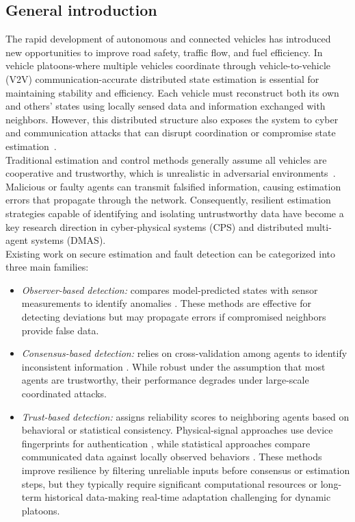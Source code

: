 \subsection{General introduction}
\vspace*{-0.3pt}
The rapid development of autonomous and connected vehicles has introduced new opportunities to improve road safety, traffic flow, and fuel efficiency. In vehicle platoons-where multiple vehicles coordinate through vehicle-to-vehicle (V2V) communication-accurate distributed state estimation is essential for maintaining stability and efficiency. Each vehicle must reconstruct both its own and others' states using locally sensed data and information exchanged with neighbors. However, this distributed structure also exposes the system to cyber and communication attacks that can disrupt coordination or compromise state estimation~\citep{Ali_book}. \\
%
Traditional estimation and control methods generally assume all vehicles are cooperative and trustworthy, which is unrealistic in adversarial environments~\citep{Shengya_HG}. Malicious or faulty agents can transmit falsified information, causing estimation errors that propagate through the network. Consequently, resilient estimation strategies capable of identifying and isolating untrustworthy data have become a key research direction in cyber-physical systems (CPS) and distributed multi-agent systems (DMAS).\\
%
Existing work on secure estimation and fault detection can be categorized into three main families:
\begin{itemize}
    \item {\it Observer-based detection:} compares model-predicted states with sensor measurements to identify anomalies \cite{Huy_LCSS,2_obs_Angelo}. These methods are effective for detecting deviations but may propagate errors if compromised neighbors provide false data.
    \item {\it Consensus-based detection:} relies on cross-validation among agents to identify inconsistent information \cite{Guitao_multi_mesure}. While robust under the assumption that most agents are trustworthy, their performance degrades under large-scale coordinated attacks.
    \item {\it Trust-based detection:} assigns reliability scores to neighboring agents based on behavioral or statistical consistency. Physical-signal approaches use device fingerprints for authentication \cite{trust_physic_connecte}, while statistical approaches compare communicated data against locally observed behaviors \cite{Wang_2021}. These methods improve resilience by filtering unreliable inputs before consensus or estimation steps, but they typically require significant computational resources or long-term historical data-making real-time adaptation challenging for dynamic platoons.
\end{itemize}
